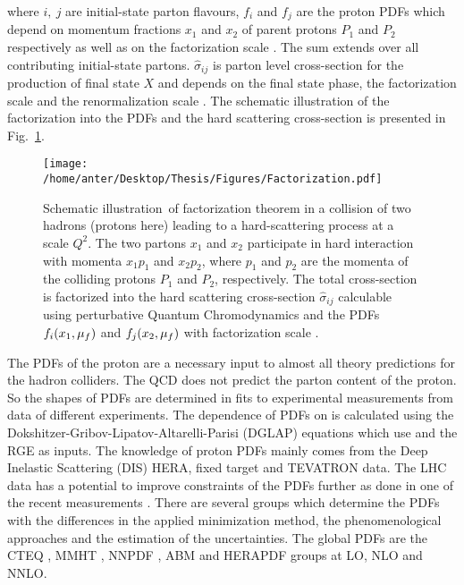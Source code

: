 where $i,~j$ are initial-state parton flavours, $f_i$ and $f_{j}$ are the proton PDFs which depend on momentum fractions $x_1$ and $x_2$ of parent protons $P_1$ and $P_2$ respectively as well as on the factorization scale \muf. The sum extends over all contributing initial-state partons. $\hat\sigma_{ij}$ is parton level cross-section for the production of final state $X$ and depends on the final state phase, the factorization scale \muf and the renormalization scale \mur. The schematic illustration of the factorization into the PDFs and the hard scattering cross-section is presented in Fig.~\ref{fig:fac}.
\begin{figure}[!h]
\begin{center}
\hspace*{-7mm}
\texttt{[image: /home/anter/Desktop/Thesis/Figures/Factorization.pdf]}\\
\vspace*{4mm}
\caption[Schematic illustration of factorization theorem in a collision of two hadrons (protons here).]{Schematic illustration\footnotemark~of factorization theorem in a collision of two hadrons (protons here) leading to a hard-scattering process at a scale $Q^2$. The two partons $x_1$ and $x_2$ participate in hard interaction with momenta $x_1p_1$ and $x_2p_2$, where $p_1$ and $p_2$ are the momenta of the colliding protons $P_1$ and $P_2$, respectively. The total cross-section is factorized into the hard scattering cross-section $\hat\sigma_{ij}$ calculable using perturbative Quantum Chromodynamics and the PDFs $f_i(x_1,\mu_f)$ and $f_j(x_2,\mu_f)$ with factorization scale \muf.}
\label{fig:fac}
\end{center}
\end{figure}
The PDFs of the proton are a necessary input to almost all theory predictions for the hadron colliders. The QCD does not predict the parton content of the proton. So the shapes of PDFs are determined in fits to experimental measurements from data of different experiments. The dependence of PDFs on \muf is calculated using the Dokshitzer-Gribov-Lipatov-Altarelli-Parisi (DGLAP) \cite{Gribov:1972ri,Dokshitzer:1977sg,Altarelli:1977zs} equations which use \alps and the RGE as inputs. The knowledge of proton PDFs mainly comes from the Deep Inelastic Scattering (DIS) HERA, fixed target and TEVATRON data. The LHC data has a potential to improve constraints of the PDFs further as done in one of the recent measurements \cite{Sirunyan:2017skj}. There are several groups which determine the PDFs with the differences in the applied minimization method, the phenomenological approaches and the estimation of the uncertainties. The global PDFs are the CTEQ \cite{Dulat:2015mca}, MMHT \cite{Harland-Lang:2014zoa}, NNPDF \cite{Ball:2014uwa}, ABM \cite{Alekhin:2012ig} and HERAPDF \cite{Abramowicz:2015mha} groups at LO, NLO and NNLO.

